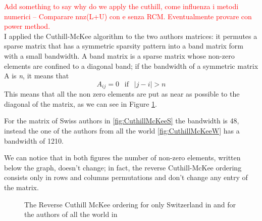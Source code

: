 \documentclass[]{usiinfbachelorproject}
\begin{document}
\textcolor{red}{Add something to say why do we apply the cuthill, come influenza i metodi numerici -- Comparare nnz(L+U) con e senza RCM. Eventualmente provare con power method.}\\
I applied the Cuthill-McKee algorithm to the two authors matrices: it permutes a sparse matrix that has a symmetric sparsity pattern into a band matrix form with a small bandwidth.
A band matrix is a sparse matrix whose non-zero elements are confined to a diagonal band; if the bandwidth of a symmetric matrix A is \textit{n}, it means that 
$$A_{ij} = 0  \:\: \text{ if } \:\: |j-i| > n$$
 This means that all the non zero elements are put as near as possible to the diagonal of the matrix, as we can see in Figure \ref{fig:CuthillMcKee}. 
 
For the matrix of Swiss authors in \ref{fig:CuthillMcKeeS} the bandwidth is 48, instead the one of the authors from all the world \ref{fig:CuthillMcKeeW} has a bandwidth of 1210. 

We can notice that in both figures the number of non-zero elements, written below the graph, doesn't change; in fact, the reverse Cuthill-McKee ordering consists only in rows and columns permutations and don't change any entry of the matrix.

\begin{figure}[tb]
	\centering
	\caption{ The Reverse Cuthill McKee ordering for only Switzerland in  and for the authors of all the world in }
	\label{fig:CuthillMcKee}
\end{figure}
\end{document}
